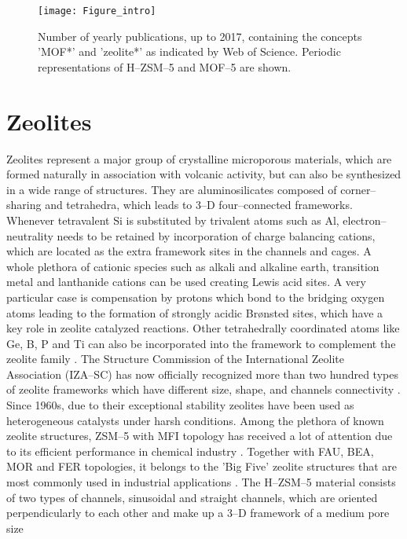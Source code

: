 \begin{figure}[!h] 
 	\centering
	\texttt{[image: Figure\_intro]}
	\caption{Number of yearly publications, up to 2017, containing the concepts
	'MOF*' and 'zeolite*' as indicated by Web of Science. Periodic representations
	of H--ZSM--5 and MOF--5 are shown.}
	\label{fig:Figure intro}
\end{figure}


\section{Zeolites}
Zeolites represent a major group of crystalline microporous materials, which are
formed naturally in association with volcanic activity, but can also be
synthesized in a wide range of structures. They are aluminosilicates composed
of corner--sharing  and  tetrahedra, which leads to 3--D
four--connected frameworks. Whenever tetravalent Si is substituted by trivalent
atoms such as Al, electron--neutrality needs to be retained by 
incorporation of charge balancing cations, which are located as the extra framework sites in the channels and cages. A whole plethora of cationic species such as alkali and alkaline earth, transition
metal and lanthanide cations can be used creating Lewis acid sites. A very
particular case is compensation by
protons which bond to the bridging oxygen atoms leading to the formation of
strongly acidic Br\o{}nsted sites, which have a key role in zeolite catalyzed
reactions. Other tetrahedrally coordinated atoms
like Ge, B, P and Ti can also be incorporated into the framework to complement the
zeolite family \cite{Nagy1998, Cejka2010, VanSpeybroeck2015}. The
Structure Commission of the International Zeolite Association (IZA--SC)
has now officially recognized more than two hundred types of zeolite frameworks
which have different size, shape, and channels connectivity \cite{Database}.
Since 1960s, due to their exceptional stability zeolites have been used as heterogeneous catalysts under harsh conditions. Among the
plethora of known zeolite structures, ZSM--5 with MFI topology has received a
lot of attention due to its efficient performance in chemical
industry \cite{Liang2017}. Together with FAU, BEA, MOR and FER topologies, it
belongs to the 'Big Five' zeolite structures that are most commonly used in
industrial applications \cite{VanSpeybroeck2015}. The H--ZSM--5 material
consists of two types of channels, sinusoidal and straight channels, which are oriented
perpendicularly to each other and make up a 3--D framework of a medium pore size
